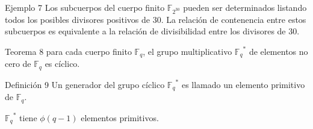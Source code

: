 \documentclass[presentation]{beamer}
\newcommand{\F}{\mathds{F}}
\begin{document}
\begin{frame}
  \begin{block}{Ejemplo 7}
    Los subcuerpos del cuerpo finito $\F_{2^{30}}$ pueden ser determinados listando todos los posibles divisores positivos de $30$. La relación de contenencia entre estos subcuerpos es equivalente a la relación de divisibilidad entre los divisores de $30$.

    \begin{figure}[H]
      \centering
    \end{figure}
  \end{block}
\end{frame}

\begin{frame}
  \begin{block}{Teorema 8}
    para cada cuerpo finito $\F_q$, el grupo multiplicativo $ {\F_{q}}^* $ de elementos no cero de $\F_q$ es cíclico.
  \end{block}
  \pause
  \begin{block}{Definición 9}
    Un generador del grupo cíclico ${\F_q}^*$ es llamado un elemento primitivo de $\F_q$.
  \end{block}
  \pause
  $ {\F_q}^* $ tiene $\phi(q-1)$ elementos primitivos.
\end{frame}
\end{document}
